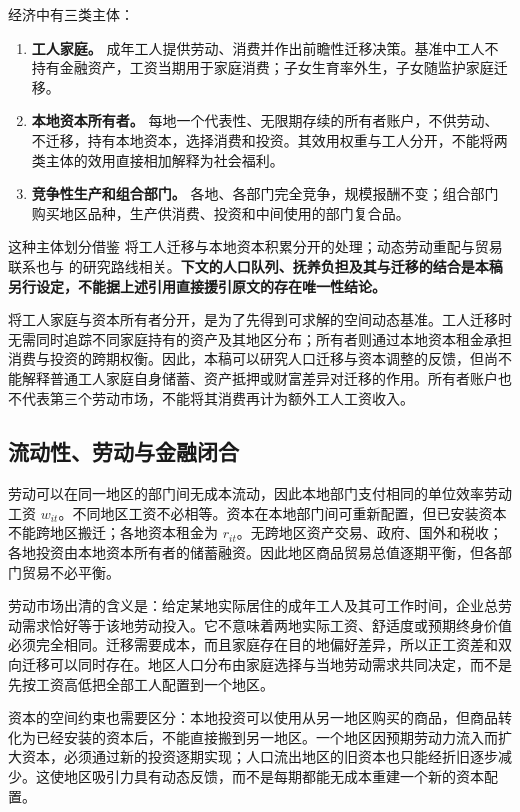 \documentclass[UTF8,a4paper,zihao=-4,fontset=windows]{ctexart}
\numberwithin{equation}{section}
\begin{document}
经济中有三类主体：
\begin{enumerate}
  \item \textbf{工人家庭。} 成年工人提供劳动、消费并作出前瞻性迁移决策。基准中工人不持有金融资产，工资当期用于家庭消费；子女生育率外生，子女随监护家庭迁移。
  \item \textbf{本地资本所有者。} 每地一个代表性、无限期存续的所有者账户，不供劳动、不迁移，持有本地资本，选择消费和投资。其效用权重与工人分开，不能将两类主体的效用直接相加解释为社会福利。
  \item \textbf{竞争性生产和组合部门。} 各地、各部门完全竞争，规模报酬不变；组合部门购买地区品种，生产供消费、投资和中间使用的部门复合品。
\end{enumerate}

这种主体划分借鉴 \citet{kleinman2023dynamic} 将工人迁移与本地资本积累分开的处理；动态劳动重配与贸易联系也与 \citet{caliendo2019trade} 的研究路线相关。\textbf{下文的人口队列、抚养负担及其与迁移的结合是本稿另行设定，不能据上述引用直接援引原文的存在唯一性结论。}

将工人家庭与资本所有者分开，是为了先得到可求解的空间动态基准。工人迁移时无需同时追踪不同家庭持有的资产及其地区分布；所有者则通过本地资本租金承担消费与投资的跨期权衡。因此，本稿可以研究人口迁移与资本调整的反馈，但尚不能解释普通工人家庭自身储蓄、资产抵押或财富差异对迁移的作用。所有者账户也不代表第三个劳动市场，不能将其消费再计为额外工人工资收入。

\subsection{流动性、劳动与金融闭合}
劳动可以在同一地区的部门间无成本流动，因此本地部门支付相同的单位效率劳动工资 $w_{it}$。不同地区工资不必相等。资本在本地部门间可重新配置，但已安装资本不能跨地区搬迁；各地资本租金为 $r_{it}$。无跨地区资产交易、政府、国外和税收；各地投资由本地资本所有者的储蓄融资。因此地区商品贸易总值逐期平衡，但各部门贸易不必平衡。

劳动市场出清的含义是：给定某地实际居住的成年工人及其可工作时间，企业总劳动需求恰好等于该地劳动投入。它不意味着两地实际工资、舒适度或预期终身价值必须完全相同。迁移需要成本，而且家庭存在目的地偏好差异，所以正工资差和双向迁移可以同时存在。地区人口分布由家庭选择与当地劳动需求共同决定，而不是先按工资高低把全部工人配置到一个地区。

资本的空间约束也需要区分：本地投资可以使用从另一地区购买的商品，但商品转化为已经安装的资本后，不能直接搬到另一地区。一个地区因预期劳动力流入而扩大资本，必须通过新的投资逐期实现；人口流出地区的旧资本也只能经折旧逐步减少。这使地区吸引力具有动态反馈，而不是每期都能无成本重建一个新的资本配置。
\end{document}
